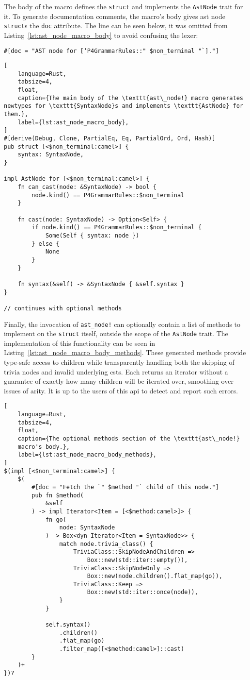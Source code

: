 The body of the macro defines the \texttt{struct} and implements the
\texttt{AstNode} trait for it. To generate documentation comments, the macro's
body gives \acrshort{ast} node \texttt{struct}s the \texttt{doc} attribute. The
line can be seen below, it was omitted from
Listing~\ref{lst:ast_node_macro_body} to avoid confusing the lexer:

\texttt{\#[doc = "AST node for [`P4GrammarRules::" \$non\_terminal "`]."]}

\begin{lstlisting}[
	language=Rust,
	tabsize=4,
	float,
	caption={The main body of the \texttt{ast\_node!} macro generates newtypes for \texttt{SyntaxNode}s and implements \texttt{AstNode} for them.},
	label={lst:ast_node_macro_body},
]
#[derive(Debug, Clone, PartialEq, Eq, PartialOrd, Ord, Hash)]
pub struct [<$non_terminal:camel>] {
	syntax: SyntaxNode,
}

impl AstNode for [<$non_terminal:camel>] {
	fn can_cast(node: &SyntaxNode) -> bool {
		node.kind() == P4GrammarRules::$non_terminal
	}

	fn cast(node: SyntaxNode) -> Option<Self> {
		if node.kind() == P4GrammarRules::$non_terminal {
			Some(Self { syntax: node })
		} else {
			None
		}
	}

	fn syntax(&self) -> &SyntaxNode { &self.syntax }
}

// continues with optional methods
\end{lstlisting}

Finally, the invocation of \texttt{ast\_node!} can optionally contain a list of
methods to implement on the \texttt{struct} itself, outside the scope of the
\texttt{AstNode} trait. The implementation of this functionality can be seen in
Listing~\ref{lst:ast_node_macro_body_methods}. These generated methods provide
type-safe access to children while transparently handling both the skipping of
trivia nodes and invalid underlying \acrshort{cst}s. Each returns an iterator
without a guarantee of exactly how many children will be iterated over,
smoothing over issues of arity. It is up to the users of this \acrshort{api} to
detect and report such errors.

\begin{lstlisting}[
	language=Rust,
	tabsize=4,
	float,
	caption={The optional methods section of the \texttt{ast\_node!}
	macro's body.},
	label={lst:ast_node_macro_body_methods},
]
$(impl [<$non_terminal:camel>] {
	$(
		#[doc = "Fetch the `" $method "` child of this node."]
		pub fn $method(
			&self
		) -> impl Iterator<Item = [<$method:camel>]> {
			fn go(
				node: SyntaxNode
			) -> Box<dyn Iterator<Item = SyntaxNode>> {
				match node.trivia_class() {
					TriviaClass::SkipNodeAndChildren =>
						Box::new(std::iter::empty()),
					TriviaClass::SkipNodeOnly =>
						Box::new(node.children().flat_map(go)),
					TriviaClass::Keep =>
						Box::new(std::iter::once(node)),
				}
			}

			self.syntax()
				.children()
				.flat_map(go)
				.filter_map([<$method:camel>]::cast)
		}
	)+
})?
\end{lstlisting}

